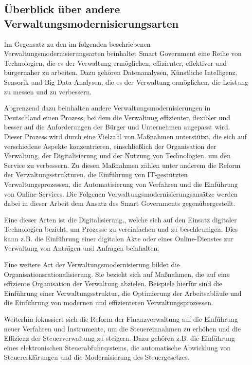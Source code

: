 \subsection{Überblick über andere Verwaltungsmodernisierungsarten}
Im Gegensatz zu den im folgenden beschriebenen Verwaltungsmodernisierungsarten beinhaltet Smart Government eine Reihe von Technologien, die es der Verwaltung ermöglichen, effizienter, effektiver und bürgernaher zu arbeiten.
Dazu gehören Datenanalysen, Künstliche Intelligenz, Sensorik und Big Data-Analysen, die es der Verwaltung ermöglichen, die Leistung zu messen und zu verbessern.
\par
Abgrenzend dazu beinhalten andere Verwaltungsmodernisierungen in Deutschland einen Prozess, bei dem die Verwaltung effizienter, flexibler und besser auf die Anforderungen der Bürger und Unternehmen angepasst wird.
Dieser Prozess wird durch eine Vielzahl von Maßnahmen unterstützt, die sich auf verschiedene Aspekte konzentrieren, einschließlich der Organisation der Verwaltung, der Digitalisierung und der Nutzung von Technologien, um den Service zu verbessern.
Zu diesen Maßnahmen zählen unter anderem die Reform der Verwaltungsstrukturen, die Einführung von IT-gestützten Verwaltungsprozessen, die Automatisierung von Verfahren und die Einführung von Online-Services.
Die Folgenen Verwaltungsmodernisierungsansätze werden dabei in dieser Arbeit dem Ansatz des Smart Governments gegenübergestellt.
\par
Eine dieser Arten ist die Digitalisierung., welche sich auf den Einsatz digitaler Technologien bezieht, um Prozesse zu vereinfachen und zu beschleunigen.
Dies kann z.B. die Einführung einer digitalen Akte oder eines Online-Dienstes zur Verwaltung von Anträgen und Anfragen beinhalten.
\par
Eine weitere Art der Verwaltungsmodernisierung bildet die Organisationsrationalisierung.
Sie bezieht sich auf Maßnahmen, die auf eine effiziente Organisation der Verwaltung abzielen.
Beispiele hierfür sind die Einführung einer Verwaltungsstruktur, die Optimierung der Arbeitsabläufe und die Einführung von modernen und effizienteren Verwaltungsprozessen.
\par
Weiterhin fokussiert sich die Reform der Finanzverwaltung auf die Einführung neuer Verfahren und Instrumente, um die Steuereinnahmen zu erhöhen und die Effizienz der Steuerverwaltung zu steigern.
Dazu gehören z.B. die Einführung eines elektronischen Steuerabfuhrsystems, die automatische Abwicklung von Steuererklärungen und die Modernisierung des Steuergesetzes.
\par
